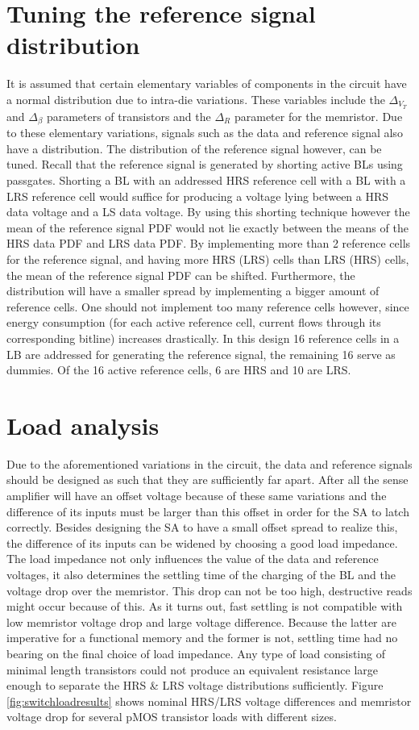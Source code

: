 \documentclass[journal]{IEEEtran}
\begin{document}
\section{Tuning the reference signal distribution}
It is assumed that certain elementary variables of components in the circuit have a normal distribution due to intra-die variations. These variables include the $\Delta_{V_{T}}$ and $\Delta_{\beta}$ parameters of transistors and the $\Delta_{R}$ parameter for the memristor. Due to these elementary variations, signals such as the data and reference signal also have a distribution. The distribution of the reference signal however, can be tuned. Recall that the reference signal is generated by shorting active BLs using passgates. Shorting a BL with an addressed HRS reference cell with a BL with a LRS reference cell would suffice for producing a voltage lying between a HRS data voltage and a LS data voltage. By using this shorting technique however the mean of the reference signal PDF would not lie exactly between the means of the HRS data PDF and LRS data PDF. By implementing more than 2 reference cells for the reference signal, and having more HRS (LRS) cells than LRS (HRS) cells, the mean of the reference signal PDF can be shifted. Furthermore, the distribution will have a smaller spread by implementing a bigger amount of reference cells. One should not implement too many reference cells however, since energy consumption (for each active reference cell, current flows through its corresponding bitline) increases drastically. In this design 16 reference cells in a LB are addressed for generating the reference signal, the remaining 16 serve as dummies. Of the 16 active reference cells, 6 are HRS and 10 are LRS.

\section{Load analysis}
Due to the aforementioned variations in the circuit, the data and reference signals should be designed as such that they are sufficiently far apart. After all the sense amplifier will have an offset voltage because of these same variations and the difference of its inputs must be larger than this offset in order for the SA to latch correctly. Besides designing the SA to have a small offset spread to realize this, the difference of its inputs can be widened by choosing a good load impedance. The load impedance not only influences the value of the data and reference voltages, it also determines the settling time of the charging of the BL and the voltage drop over the memristor. This drop can not be too high, destructive reads might occur because of this. As it turns out, fast settling is not compatible with low memristor voltage drop and large voltage difference. Because the latter are imperative for a functional memory and the former is not, settling time had no bearing on the final choice of load impedance.
Any type of load consisting of minimal length transistors could not produce an equivalent resistance large enough to separate the HRS \& LRS voltage distributions sufficiently. Figure \ref{fig:switchloadresults} shows nominal HRS/LRS voltage differences and memristor voltage drop for several pMOS transistor loads with different sizes. 
\end{document}
